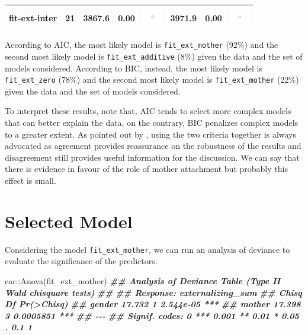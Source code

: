 \documentclass[
]{book}
\newenvironment{Shaded}{\begin{snugshade}}{\end{snugshade}}
\newcommand{\DocumentationTok}[1]{\textcolor[rgb]{0.56,0.35,0.01}{\textbf{\textit{#1}}}}
\newcommand{\FunctionTok}[1]{\textcolor[rgb]{0.00,0.00,0.00}{#1}}
\newcommand{\NormalTok}[1]{#1}
\newcommand{\SpecialCharTok}[1]{\textcolor[rgb]{0.00,0.00,0.00}{#1}}
\begin{document}
\begin{table}[!h]
{\begin{tabular}[t]{rccc>{\centering\arraybackslash}m{1cm}cc>{\centering\arraybackslash}m{1cm}}
fit-ext-inter & 21 & 3867.6 & 0.00 & \includegraphics[width=0.33in, height=0.33in]{images/ball_AIC_ext_inter.png} & 3971.9 & 0.00 & \includegraphics[width=0.33in, height=0.33in]{images/ball_BIC_ext_inter.png}\\
\bottomrule
\end{tabular}}
\end{table}

According to AIC, the most likely model is \texttt{fit\_ext\_mother} (92\%) and the second most likely model is \texttt{fit\_ext\_additive} (8\%) given the data and the set of models considered. According to BIC, instead, the most likely model is \texttt{fit\_ext\_zero} (78\%) and the second most likely model is \texttt{fit\_ext\_mother} (22\%) given the data and the set of models considered.

To interpret these results, note that, AIC tends to select more complex models that can better explain the data, on the contrary, BIC penalizes complex models to a greater extent. As pointed out by \citet{kuhaAICBICComparisons2004}, using the two criteria together is always advocated as agreement provides reassurance on the robustness of the results and disagreement still provides useful information for the discussion. We can say that there is evidence in favour of the role of mother attachment but probably this effect is small.

\hypertarget{selected-model}{%
\section{Selected Model}\label{selected-model}}

Considering the model \texttt{fit\_ext\_mother}, we can run an analysis of deviance to evaluate the significance of the predictors.

\begin{Shaded}
\begin{Highlighting}[]
\NormalTok{car}\SpecialCharTok{::}\FunctionTok{Anova}\NormalTok{(fit\_ext\_mother)}
\DocumentationTok{\#\# Analysis of Deviance Table (Type II Wald chisquare tests)}
\DocumentationTok{\#\# }
\DocumentationTok{\#\# Response: externalizing\_sum}
\DocumentationTok{\#\#         Chisq Df Pr(\textgreater{}Chisq)    }
\DocumentationTok{\#\# gender 17.732  1  2.544e{-}05 ***}
\DocumentationTok{\#\# mother 17.398  3  0.0005851 ***}
\DocumentationTok{\#\# {-}{-}{-}}
\DocumentationTok{\#\# Signif. codes:  0 \textquotesingle{}***\textquotesingle{} 0.001 \textquotesingle{}**\textquotesingle{} 0.01 \textquotesingle{}*\textquotesingle{} 0.05 \textquotesingle{}.\textquotesingle{} 0.1 \textquotesingle{} \textquotesingle{} 1}
\end{Highlighting}
\end{Shaded}
\end{document}
